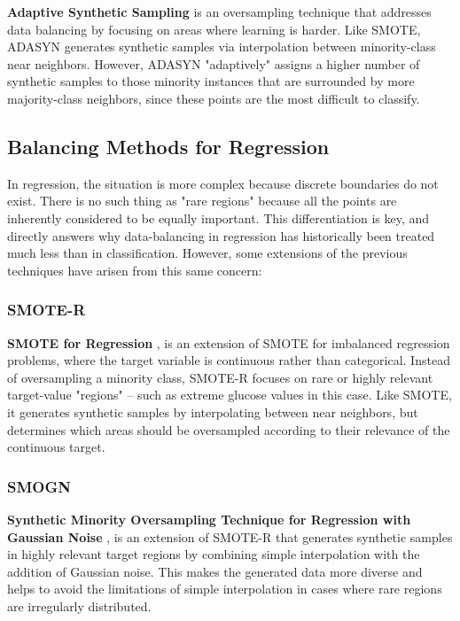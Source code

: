 \textbf{Adaptive Synthetic Sampling} \cite{4633969} is an oversampling technique that addresses data balancing by focusing on areas where learning is harder. Like SMOTE, ADASYN generates synthetic samples via interpolation between minority-class near neighbors. However, ADASYN "adaptively" assigns a higher number of synthetic samples to those minority instances that are surrounded by more majority-class neighbors, since these points are the most difficult to classify.

\subsection{Balancing Methods for Regression}
\label{subsec:soa_data_balancing_regression}

In regression, the situation is more complex because discrete boundaries do not exist. There is no such thing as "rare regions" because all the points are inherently considered to be equally important. This differentiation is key, and directly answers why data-balancing in regression has historically been treated much less than in classification. However, some extensions of the previous techniques have arisen from this same concern:

\subsubsection{SMOTE-R}
\label{subsubsec:soa_smoter}

\textbf{SMOTE for Regression} \cite{10.1007/978-3-642-40669-0_33}, is an extension of SMOTE for imbalanced regression problems, where the target variable is continuous rather than categorical. Instead of oversampling a minority class, SMOTE-R focuses on rare or highly relevant target-value "regions" – such as extreme glucose values in this case. Like SMOTE, it generates synthetic samples by interpolating between near neighbors, but determines which areas should be oversampled according to their relevance of the continuous target.

\subsubsection{SMOGN}
\label{subsubsec:soa_smogn}

\textbf{Synthetic Minority Oversampling Technique for Regression with Gaussian Noise} \cite{pmlr-v74-branco17a}, is an extension of SMOTE-R that generates synthetic samples in highly relevant target regions by combining simple interpolation with the addition of Gaussian noise. This makes the generated data more diverse and helps to avoid the limitations of simple interpolation in cases where rare regions are irregularly distributed.

